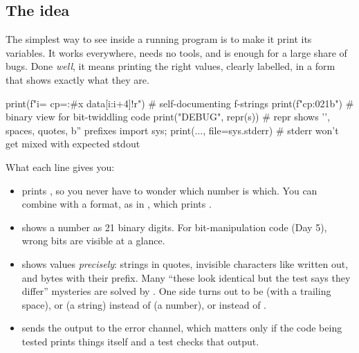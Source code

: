 \documentclass[10pt,a4paper]{article}
\begin{document}
\subsection{The idea}
The simplest way to see inside a running program is to make it print its variables. It works everywhere, needs no tools, and is enough for a large share of bugs. Done \emph{well}, it means printing the right values, clearly labelled, in a form that shows exactly what they are.
\begin{pycode}
print(f"{i=} {cp=:#x} {data[i:i+4]!r}")      # self-documenting f-strings
print(f"{cp:021b}")                           # binary view for bit-twiddling code
print("DEBUG", repr(s))                       # repr shows '\n', spaces, quotes, b'' prefixes
import sys; print(..., file=sys.stderr)       # stderr won't get mixed with expected stdout
\end{pycode}
What each line gives you:
\begin{itemize}
\item {} prints , so you never have to wonder which number is which. You can combine \code{=\allowbreak{}} with a format, as in , which prints .
\item {} shows a number as 21 binary digits. For bit-manipulation code (Day 5), wrong bits are visible at a glance.
\item {} shows values \emph{precisely}: strings in quotes, invisible characters like  written out, and bytes with their  prefix. Many “these look identical but the test says they differ” mysteries are solved by . One side turns out to be  (with a trailing space), or  (a string) instead of  (a number), or  instead of .
\item {} sends the output to the error channel, which matters only if the code being tested prints things itself and a test checks that output.
\end{itemize}
\end{document}
